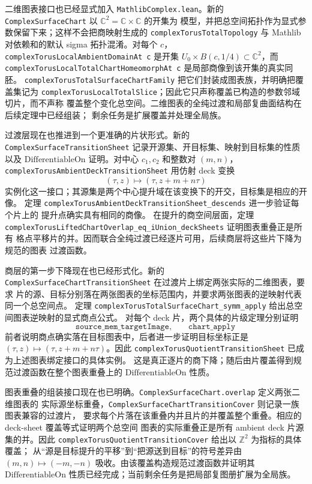 \documentclass[UTF8,fontset=none,a4paper,11pt]{ctexart}
\begin{document}
二维图表接口也已经显式加入 \texttt{MathlibComplex.lean}。新的
\texttt{ComplexSurfaceChart} 以 \(\mathbb C^2=\mathbb C\times\mathbb C\) 的开集为
模型，并把总空间拓扑作为显式参数保留下来；这样不会把商映射生成的
\texttt{complexTorusTotalTopology} 与 Mathlib 对依赖和的默认 sigma 拓扑混淆。对每个
\(c\)，\texttt{complexTorusLocalAmbientDomainAt c} 是开集
\(U_0\times B(c,1/4)\subset\mathbb C^2\)，而
\texttt{complexTorusLocalTotalChartHomeomorphAt c} 是局部商像到该开集的真实同胚。
\texttt{complexTorusTotalSurfaceChartFamily} 把它们封装成图表族，并明确把覆盖集记为
\texttt{complexTorusLocalTotalSlice}；因此它只声称覆盖已构造的参数邻域切片，而不声称
覆盖整个变化总空间。二维图表的全纯过渡和局部复曲面结构在后续定理中已经组装；
剩余任务是扩展覆盖并处理全局族。

过渡层现在也推进到一个更准确的片状形式。新的
\texttt{ComplexSurfaceTransitionSheet} 记录开源集、开目标集、映射到目标集的性质
以及 \(\mathrm{DifferentiableOn}\) 证明。对中心 \(c_1,c_2\) 和整数对 \((m,n)\)，
\texttt{complexTorusAmbientDeckTransitionSheet} 用仿射 deck 变换
\[
  (\tau,z)\longmapsto(\tau,z+m+n\tau)
\]
实例化这一接口；其源集是两个中心提升域在该变换下的开交，目标集是相应的开像。
定理 \texttt{complexTorusAmbientDeckTransitionSheet\_descends} 进一步验证每个片上的
提升点确实具有相同的商像。
在提升的商空间层面，定理
\texttt{complexTorusLiftedChartOverlap\_eq\_iUnion\_}\allowbreak\texttt{deckSheets} 证明图表重叠正是所有
格点平移片的并。因而联合全纯过渡已经逐片可用，后续商层将这些片下降为规范的图表
过渡函数。

商层的第一步下降现在也已经形式化。新的
\texttt{ComplexSurfaceChartTransitionSheet} 在过渡片上绑定两张实际的二维图表，要求
片的源、目标分别落在两张图表的坐标范围内，并要求两张图表的逆映射代表同一个总空间点。
定理 \texttt{complexTorusTotalSurfaceChart\_symm\_apply} 给出总空间图表逆映射的显式商点公式。
对每个 deck 片，两个具体的片级定理分别证明
\[
\texttt{source\_mem\_targetImage},\qquad
\texttt{chart\_apply}
\]
前者说明商点确实落在目标图表中，后者进一步证明目标坐标正是
\((\tau,z)\mapsto(\tau,z+m+n\tau)\)。因此
\texttt{complexTorusQuotientTransitionSheet} 已成为上述图表绑定接口的具体实例。
这是真正逐片的商下降；随后由片覆盖得到规范过渡函数在整个图表重叠上的
\(\mathrm{DifferentiableOn}\) 性质。

图表重叠的组装接口现在也已明确。\texttt{ComplexSurfaceChart.overlap} 定义两张二维图表的
实际源坐标重叠，\texttt{ComplexSurfaceChartTransitionCover} 则记录一族图表兼容的过渡片，
要求每个片落在该重叠内并且片的并覆盖整个重叠。相应的 deck-sheet 覆盖等式证明两个总空间
图表的实际重叠正是所有 ambient deck 片源集的并。因此
\texttt{complexTorusQuotientTransitionCover} 给出以 \(\mathbb Z^2\) 为指标的具体覆盖；
从“源是目标提升的平移”到“把源送到目标”的符号差异由
\((m,n)\mapsto(-m,-n)\) 吸收。由该覆盖构造规范过渡函数并证明其
\(\mathrm{DifferentiableOn}\) 性质已经完成；当前剩余任务是把局部复图册扩展为全局族。
\end{document}
